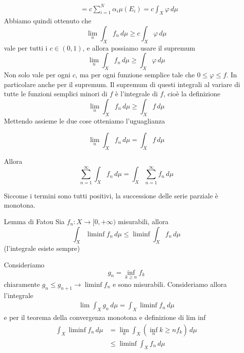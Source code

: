 \documentclass[a4paper]{article}
\begin{document}
\begin{snippetproof}{}
\begin{align*}
        &= c\sum_{i=1}^N \alpha_i \mu(E_i) = c\int_X \varphi\,d\mu
    \end{align*}
    Abbiamo quindi ottenuto che
    \[
        \lim_n \int_X f_n \,d\mu \geq c\int_X \varphi\,d\mu
    \]
    vale per tutti i \(c\in(0,1)\), e allora possiamo usare il supremum
    \[
        \lim_n \int_X f_n \,d\mu \geq \int_X \varphi\,d\mu
    \]
    Non solo vale per ogni \(c\), ma per ogni funzione semplice tale che \(0\leq \varphi \leq f\).
    In particolare anche per il supremum. Il supremum di questi integrali al variare di tutte le funzioni semplici
    minori di \(f\) è l'integrale di \(f\), cioè la definizione
    \[
        \lim_n \int_X f_n \,d\mu \geq \int_X f\,d\mu
    \]
    Mettendo assieme le due cose otteniamo l'uguaglianza
    
    \[
        \lim_n \int_X f_n \,d\mu = \int_X f\,d\mu
    \]
\end{snippetproof}

\begin{snippetcorollary}{}
    Allora
    \[
        \sum_{n=1}^\infty \int_X f_n\,d\mu = \int_X \sum_{n=1}^\infty f_n\,d\mu
    \]
\end{snippetcorollary}

\begin{snippetproof}{}
    Siccome i termini sono tutti positivi, la successione delle serie parziale è monotona.
\end{snippetproof}

\begin{radioactive}
\begin{snippetlemma}{Lemma di Fatou}
    Sia \(f_n \colon X \to [0, +\infty)\) misurabili, allora
    \[
        \int_X \liminf f_n\,d\mu \leq \liminf \int_X f_n\,d\mu
    \]
    (l'integrale esiste sempre)
\end{snippetlemma}
\end{radioactive}

\begin{snippetproof}{}
    Consideriamo
    \[
        g_n = \inf_{k\geq n} f_k
    \]
    chiaramente \(g_n \leq g_{n+1} \to \liminf f_n\) e sono misurabili.
    Consideriamo allora l'integrale
    \begin{align*}
        \lim \int_X g_n \,d\mu = \int_X \liminf f_n\,d\mu
    \end{align*}
    e per il teorema della convergenza monotona e definizione di lim inf
    \begin{align*}
        \int_X \liminf f_n\,d\mu &= \lim_n \int_X (\inf_n{k\geq n} f_k)\,d\mu \\
        &\leq \liminf \int_X f_n\,d\mu
    \end{align*}
\end{snippetproof}
\end{document}
